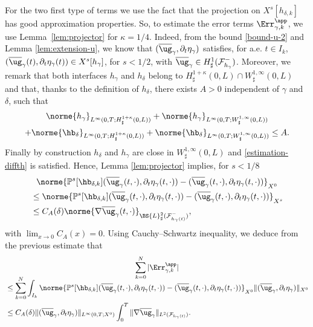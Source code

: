 For the two first type of terms we use the fact that the projection on $X^s[h_{\delta, k}]$ has good approximation properties. So, to estimate the error terms $\Err^{\app}_{\gamma,k}$, we use Lemma~\ref{lem:projector} for $\kappa=1/4$. Indeed, from the bound \eqref{bound-u-2} and Lemma \eqref{lem:extension-u}, we know that $(\overline{\ug}_{\gamma},\partial_t \eta_\gamma)$ satisfies, for a.e. $t \in I_k$, $(\overline{\ug}_{\gamma}(t),\partial_t \eta_{\gamma}(t)) \in X^s[h_{\gamma}]$, for $s<1/2$, with $\overline{\ug}_{\gamma} \in H_\sharp^1(\mathcal F^-_{h_{\gamma}})$. Moreover, we remark that both interfaces $h_{\gamma}$ and $h_\delta$ belong to $H^{1+\kappa}_{\sharp}(0,L) \cap W_\sharp^{1,\infty}(0,L)$ and that, thanks to the definition of $h_\delta$, there exists $A >0$ independent of $\gamma$ and $\delta$, such that\vspace*{-5pt}
\begin{multline*}
\norme{h_{\gamma}}_{L^{\infty}(0,T;H^{1+\kappa}_{\sharp}(0,L))}+\norme{h_{\gamma}}_{L^{\infty}(0,T;W^{1,\infty}_{\sharp}(0,L))} \\
+\norme{\hb_{\delta}}_{L^{\infty}(0,T;H^{1+\kappa}_{\sharp}(0,L))}+\norme{\hb_{\delta}}_{L^{\infty}(0,T;W^{1,\infty}_{\sharp}(0,L))}\leq A.
\end{multline*}
Finally by construction $h_\delta$ and $h_\gamma$ are close in $W^{1, \infty}_\sharp(0, L)$ and \eqref{estimation-diffth} is satisfied.
Hence,
Lemma \ref{lem:projector} implies, for $s<1/8$\vspace*{-3pt}
\begin{multline*}
\norme{\mathbb{P}^{s}[\hb_{\delta, k}](\overline{\ug}_{\gamma}(t,\cdot),\partial_{t}\eta_{\gamma}(t,\cdot)) -(\overline{\ug}_{\gamma}(t,\cdot),\partial_{t}\eta_{\gamma}(t,\cdot))}_{X^0} \\
\begin{aligned}
&\leq\norme{\mathbb{P}^{s}[\hb_{\delta, k}](\overline{\ug}_{\gamma}(t,\cdot),\partial_{t}\eta_{\gamma}(t,\cdot)) -(\overline{\ug}_{\gamma}(t,\cdot),\partial_{t}\eta_{\gamma}(t,\cdot))}_{X^s}\\
&\leq C_{A}(\delta)\norme{\nabla \overline{\ug}_{\gamma}(t,\cdot)}_{\BS{L}^{2}_{\sharp}(\mathcal{F}^{-}_{h_{\gamma}(t)})},
\end{aligned}
\end{multline*}
with $\lim_{x\to 0} C_A(x)=0$.
Using Cauchy--Schwartz inequality, we deduce from the previous estimate that\vspace*{-5pt}
\begin{multline*}
\sum_{k=0}^N |\Err_{\gamma,k}^{\app}| \\[-8pt]
\begin{aligned}
& \leq \sum_{k=0}^N \int_{I_k} \norme{\mathbb{P}^{s}[\hb_{\delta, k}](\overline{\ug}_{\gamma}(t,\cdot),\partial_{t}\eta_{\gamma}(t,\cdot)) -(\overline{\ug}_{\gamma}(t,\cdot),\partial_{t}\eta_{\gamma}(t,\cdot))}_{X^0}
\|(\overline{\ug}_{\gamma},\partial_t \eta_{\gamma})\|_{X^0} \\
& \leq C_A({\delta})\|(\overline{\ug}_{\gamma},\partial_t \eta_{\gamma})\|_{L^\infty(0, T;X^0)} \int_0^T \|\nabla \overline{\ug}_{\gamma}\|_{L^2(\mathcal F_{h_{\gamma}(t)})}.
\end{aligned}
\end{multline*}
